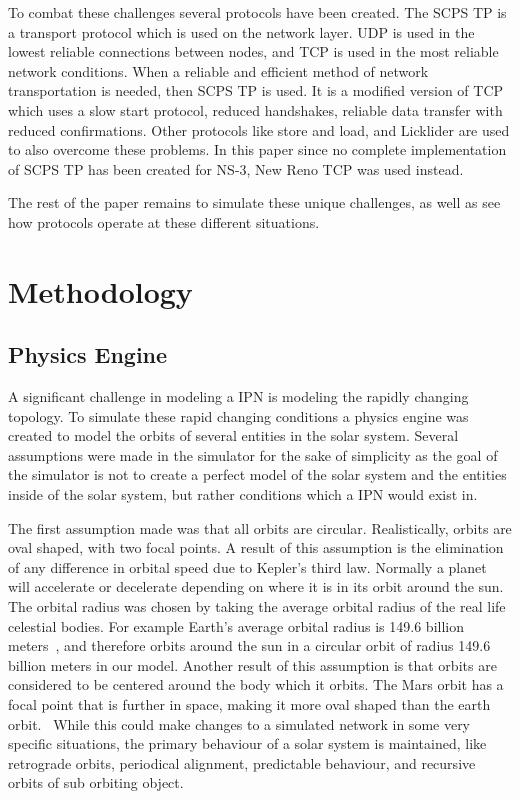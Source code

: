 \documentclass[a4paper,12pt]{article}
\begin{document}
To combat these challenges several protocols have been created. The SCPS TP is a
transport protocol which is used on the network layer. UDP is used in the lowest
reliable connections between nodes, and TCP is used in the most reliable network
conditions. When a reliable and efficient method of network transportation is
needed, then SCPS TP is used. It is a modified version of TCP which uses a slow
start protocol, reduced handshakes, reliable data transfer with reduced
confirmations. Other protocols like store and load, and Licklider are used to
also overcome these problems. In this paper since no complete implementation of
SCPS TP has been created for NS-3, New Reno TCP was used instead.

The rest of the paper remains to simulate these unique challenges, as well as
see how protocols operate at these different situations.

\section{Methodology}

\subsection{Physics Engine}

A significant challenge in modeling a IPN is modeling the rapidly changing
topology. To simulate these rapid changing conditions a physics engine was
created to model the orbits of several entities in the solar system. Several
assumptions were made in the simulator for the sake of simplicity as the goal of
the simulator is not to create a perfect model of the solar system and the
entities inside of the solar system, but rather conditions which a IPN would
exist in.

The first assumption made was that all orbits are circular. Realistically,
orbits are oval shaped, with two focal points. A result of this assumption is
the elimination of any difference in orbital speed due to Kepler's third law.
Normally a planet will accelerate or decelerate depending on where it is in its
orbit around the sun. The orbital radius was chosen by taking the average
orbital radius of the real life celestial bodies. For example Earth's average
orbital radius is 149.6 billion meters~\cite{nasa_earth}, and therefore orbits
around the sun in a circular orbit of radius 149.6 billion meters in our model.
Another result of this assumption is that orbits are considered to be centered
around the body which it orbits. The Mars orbit has a focal point that is
further in space, making it more oval shaped than the earth
orbit.~\cite{nasa_mars} While this could make changes to a simulated network in
some very specific situations, the primary behaviour of a solar system is
maintained, like retrograde orbits, periodical alignment, predictable behaviour,
and recursive orbits of sub orbiting object.
\end{document}
